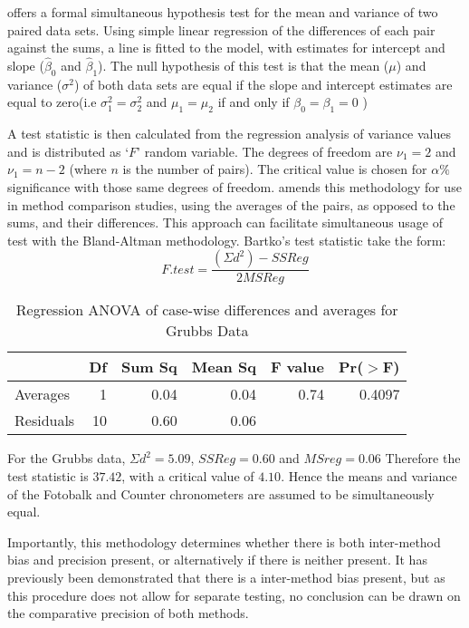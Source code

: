 \documentclass[Main.tex]{subfiles}
\begin{document}
\citet{BB89} offers a formal simultaneous hypothesis test for the
mean and variance of two paired data sets. Using simple linear
regression of the differences of each pair against the sums, a
line is fitted to the model, with estimates for intercept and
slope ($\hat{\beta}_{0}$ and $\hat{\beta}_{1}$). The null
hypothesis of this test is that the mean ($\mu$) and variance
($\sigma^{2}$) of both data sets are equal if the slope and
intercept estimates are equal to zero(i.e $\sigma^{2}_{1} =
\sigma^{2}_{2}$ and $\mu_{1}=\mu_{2}$ if and only if $\beta_{0}=
\beta_{1}=0$ )

A test statistic is then calculated from the regression analysis
of variance values \citep{BB89} and is distributed as `$F$' random
variable. The degrees of freedom are $\nu_{1}=2$ and $\nu_{1}=n-2$
(where $n$ is the number of pairs). The critical value is chosen
for $\alpha\%$ significance with those same degrees of freedom.
\citet{Bartko} amends this methodology for use in method
comparison studies, using the averages of the pairs, as opposed to
the sums, and their differences. This approach can facilitate
simultaneous usage of test with the Bland-Altman methodology.
Bartko's test statistic take the form:
\[ F.test = \frac{(\Sigma d^{2})-SSReg}{2MSReg}
\]
\begin{table}[ht]
	\begin{center}
		\begin{tabular}{lrrrrr}
			\hline
			& Df & Sum Sq & Mean Sq & F value & Pr($>$F) \\
			\hline
			Averages & 1 & 0.04 & 0.04 & 0.74 & 0.4097 \\
			Residuals & 10 & 0.60 & 0.06 &  &  \\
			\hline
		\end{tabular}
		\caption{Regression ANOVA of case-wise differences and averages
			for Grubbs Data}
	\end{center}
\end{table}
	


For the Grubbs data, $\Sigma d^{2}=5.09 $, $SSReg = 0.60$ and
$MSreg=0.06$ Therefore the test statistic is $37.42$, with a
critical value of $4.10$. Hence the means and variance of the
Fotobalk and Counter chronometers are assumed to be simultaneously
equal.

Importantly, this methodology determines whether there is both
inter-method bias and precision present, or alternatively if there
is neither present. It has previously been demonstrated that there
is a inter-method bias present, but as this procedure does not
allow for separate testing, no conclusion can be drawn on the
comparative precision of both methods.
\end{document}
